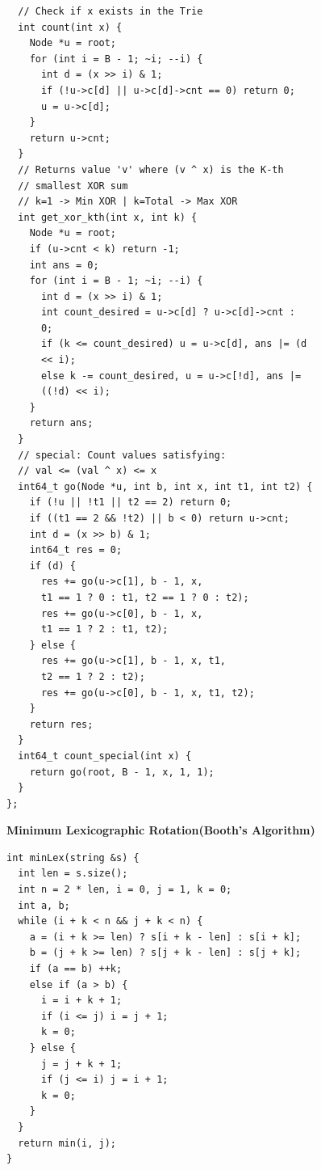 \begin{lstlisting}
  // Check if x exists in the Trie
  int count(int x) {
    Node *u = root;
    for (int i = B - 1; ~i; --i) {
      int d = (x >> i) & 1;
      if (!u->c[d] || u->c[d]->cnt == 0) return 0;
      u = u->c[d];
    }
    return u->cnt;
  }
  // Returns value 'v' where (v ^ x) is the K-th
  // smallest XOR sum
  // k=1 -> Min XOR | k=Total -> Max XOR
  int get_xor_kth(int x, int k) {
    Node *u = root;
    if (u->cnt < k) return -1;
    int ans = 0;
    for (int i = B - 1; ~i; --i) {
      int d = (x >> i) & 1;
      int count_desired = u->c[d] ? u->c[d]->cnt :
      0;
      if (k <= count_desired) u = u->c[d], ans |= (d
      << i);
      else k -= count_desired, u = u->c[!d], ans |=
      ((!d) << i);
    }
    return ans;
  }
  // special: Count values satisfying:
  // val <= (val ^ x) <= x
  int64_t go(Node *u, int b, int x, int t1, int t2) {
    if (!u || !t1 || t2 == 2) return 0;
    if ((t1 == 2 && !t2) || b < 0) return u->cnt;
    int d = (x >> b) & 1;
    int64_t res = 0;
    if (d) {
      res += go(u->c[1], b - 1, x,
      t1 == 1 ? 0 : t1, t2 == 1 ? 0 : t2);
      res += go(u->c[0], b - 1, x,
      t1 == 1 ? 2 : t1, t2);
    } else {
      res += go(u->c[1], b - 1, x, t1,
      t2 == 1 ? 2 : t2);
      res += go(u->c[0], b - 1, x, t1, t2);
    }
    return res;
  }
  int64_t count_special(int x) {
    return go(root, B - 1, x, 1, 1);
  }
};
\end{lstlisting}

\textbf{Minimum Lexicographic Rotation(Booth's Algorithm)}
\begin{lstlisting}
int minLex(string &s) {
  int len = s.size();
  int n = 2 * len, i = 0, j = 1, k = 0;
  int a, b;
  while (i + k < n && j + k < n) {
    a = (i + k >= len) ? s[i + k - len] : s[i + k];
    b = (j + k >= len) ? s[j + k - len] : s[j + k];
    if (a == b) ++k;
    else if (a > b) {
      i = i + k + 1;
      if (i <= j) i = j + 1;
      k = 0;
    } else {
      j = j + k + 1;
      if (j <= i) j = i + 1;
      k = 0;
    }
  }
  return min(i, j);
}
\end{lstlisting}
